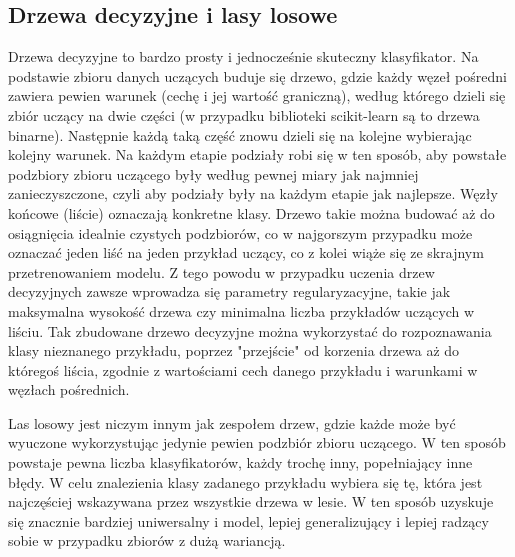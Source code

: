 \documentclass{classrep}
\begin{document}
{        \subsection{Drzewa decyzyjne i lasy losowe}
        \label{drzewa_decyzyjne_intro} {
            Drzewa decyzyjne to bardzo prosty i jednocześnie skuteczny klasyfikator. Na
            podstawie zbioru danych uczących buduje się drzewo, gdzie każdy węzeł
            pośredni zawiera pewien warunek (cechę i jej wartość graniczną), według
            którego dzieli się zbiór uczący na dwie części (w przypadku biblioteki
            scikit-learn są to drzewa binarne). Następnie każdą taką część znowu dzieli
            się na kolejne wybierając kolejny warunek. Na każdym etapie podziały robi
            się w ten sposób, aby powstałe podzbiory zbioru uczącego były według pewnej
            miary jak najmniej zanieczyszczone, czyli aby podziały były na każdym
            etapie jak najlepsze. Węzły końcowe (liście) oznaczają konkretne klasy.
            Drzewo takie można budować aż do osiągnięcia idealnie czystych podzbiorów,
            co w najgorszym przypadku może oznaczać jeden liść na jeden przykład
            uczący, co z kolei wiąże się ze skrajnym przetrenowaniem modelu. Z tego
            powodu w przypadku uczenia drzew decyzyjnych zawsze wprowadza się parametry
            regularyzacyjne, takie jak maksymalna wysokość drzewa czy minimalna liczba
            przykładów uczących w liściu. Tak zbudowane drzewo decyzyjne można
            wykorzystać do rozpoznawania klasy nieznanego przykładu, poprzez
            "przejście" od korzenia drzewa aż do któregoś liścia, zgodnie z wartościami
            cech danego przykładu i warunkami w węzłach pośrednich.

            Las losowy jest niczym innym jak zespołem drzew, gdzie każde może być
            wyuczone wykorzystując jedynie pewien podzbiór zbioru uczącego. W ten
            sposób powstaje pewna liczba klasyfikatorów, każdy trochę inny,
            popełniający inne błędy. W celu znalezienia klasy zadanego przykładu
            wybiera się tę, która jest najczęściej wskazywana przez wszystkie drzewa w
            lesie. W ten sposób uzyskuje się znacznie bardziej uniwersalny i model,
            lepiej generalizujący i lepiej radzący sobie w przypadku zbiorów z dużą
            wariancją.
        }
    }
    \newpage
    
\end{document}
